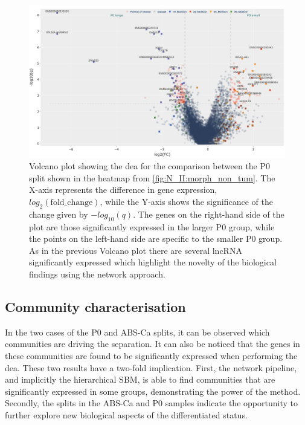 \begin{figure}    
    \centering
    \includegraphics[width=1.0\textwidth,height=1.0\textheight,keepaspectratio]{Sections/Network_II/resources/non_tum/p0_split_dea.png}
    \caption[Volcano plot -  P0 splits comparison]{Volcano plot showing the \acrlong{dea} for the comparison between the P0 split shown in the heatmap from \cref{fig:N_II:morph_non_tum}. The X-axis represents the difference in gene expression, $log_2(\text{fold\_change})$, while the Y-axis shows the significance of the change given by $-log_{10}(q)$. The genes on the right-hand side of the plot are those significantly expressed in the larger P0 group, while the points on the left-hand side are specific to the smaller P0 group. As in the previous Volcano plot there are several \acrshort{lncRNA} significantly expressed which highlight the novelty of the biological findings using the network approach.}
    \label{fig:N_II:p0_split}
\end{figure}

\subsection{Community characterisation} \label{s:N_II:comm_charact}

In the two cases of the P0 and ABS-Ca splits, it can be observed which communities are driving the separation. It can also be noticed that the genes in these communities are found to be significantly expressed when performing the \acrlong{dea}. These two results have a two-fold implication. First, the network pipeline, and implicitly the hierarchical SBM, is able to find communities that are significantly expressed in some groups, demonstrating the power of the method. Secondly, the splits in the ABS-Ca and P0 samples indicate the opportunity to further explore new biological aspects of the differentiated status.

